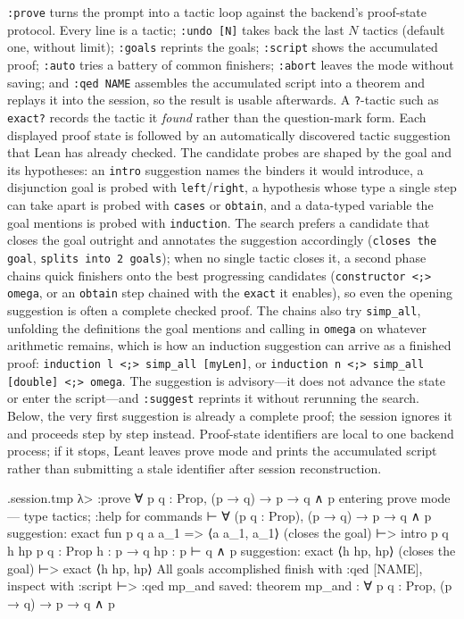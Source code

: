 \documentclass[11pt,oneside]{article}
\newcommand{\code}[1]{\texttt{#1}}
\newenvironment{session}
 {\VerbatimEnvironment\begin{VerbatimOut}{\jobname.session.tmp}}
 {\end{VerbatimOut}%
  \begin{sessionouter}%
  \VerbatimInput[fontsize=\footnotesize, breaklines=true,
    breaksymbolleft={\textcolor{stone}{\footnotesize$\hookrightarrow$}},
    formatcom=\color{ink}, tabsize=4]{\jobname.session.tmp}%
  \end{sessionouter}}
\begin{document}
\code{:prove} turns the prompt into a tactic loop against the
backend's proof-state protocol. Every line is a tactic; \code{:undo
[N]} takes back the last $N$ tactics (default one, without limit);
\code{:goals} reprints the goals; \code{:script} shows the accumulated
proof; \code{:auto} tries a battery of common finishers; \code{:abort}
leaves the mode without saving; and \code{:qed NAME} assembles the
accumulated script into a theorem and replays it into the session, so
the result is usable afterwards.  A \code{?}-tactic such as
\code{exact?} records the tactic it \emph{found} rather than the
question-mark form.  Each displayed proof state is followed by an automatically
discovered tactic suggestion that Lean has already checked.  The
candidate probes are shaped by the goal and its hypotheses: an
\code{intro} suggestion names the binders it would introduce, a
disjunction goal is probed with \code{left}/\code{right}, a
hypothesis whose type a single step can take apart is probed with
\code{cases} or \code{obtain}, and a data-typed variable the goal
mentions is probed with \code{induction}.  The search prefers a
candidate that closes the goal outright and annotates the suggestion
accordingly (\code{closes the goal}, \code{splits into 2 goals}); when
no single tactic closes it, a second phase chains quick finishers onto
the best progressing candidates (\code{constructor <;> omega}, or an
\code{obtain} step chained with the \code{exact} it enables), so even
the opening suggestion is often a complete checked proof.  The chains
also try \code{simp\_all}, unfolding the definitions the goal mentions
and calling in \code{omega} on whatever arithmetic remains, which is
how an induction suggestion can arrive as a finished proof:
\code{induction l <;> simp\_all [myLen]}, or
\code{induction n <;> simp\_all [double] <;> omega}.
The suggestion is advisory---it does not advance the state or enter the
script---and \code{:suggest} reprints it without rerunning the search.
Below, the very first suggestion is already a complete proof; the session
ignores it and proceeds step by step instead.
Proof-state identifiers are local to one backend process; if it stops,
Leant leaves prove mode and prints the accumulated script rather than
submitting a stale identifier after session reconstruction.

\begin{session}
λ> :prove ∀ p q : Prop, (p → q) → p → q ∧ p
entering prove mode — type tactics; :help for commands
⊢ ∀ (p q : Prop), (p → q) → p → q ∧ p
suggestion: exact fun p q a a_1 => ⟨a a_1, a_1⟩  (closes the goal)
⊢> intro p q h hp
p q : Prop
h : p → q
hp : p
⊢ q ∧ p
suggestion: exact ⟨h hp, hp⟩  (closes the goal)
⊢> exact ⟨h hp, hp⟩
All goals accomplished
finish with :qed [NAME], inspect with :script
⊢> :qed mp_and
saved: theorem mp_and : ∀ p q : Prop, (p → q) → p → q ∧ p
\end{session}
\end{document}

